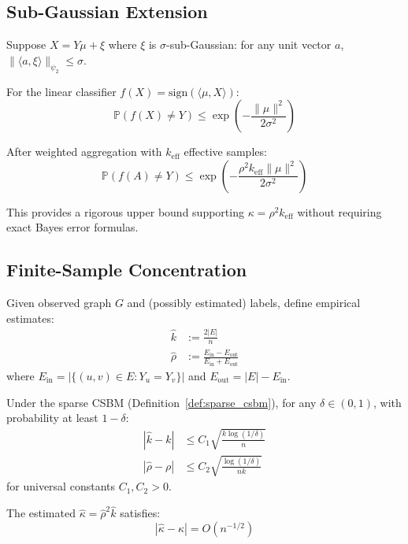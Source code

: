 \subsection{Sub-Gaussian Extension}
\label{subsec:subgaussian_rigorous}

\begin{theorem}
\label{thm:subgaussian_error}
Suppose $X = Y\mu + \xi$ where $\xi$ is $\sigma$-sub-Gaussian: for any unit vector $a$, $\|\langle a, \xi \rangle\|_{\psi_2} \leq \sigma$.

For the linear classifier $f(X) = \mathrm{sign}(\langle \mu, X \rangle)$:
\begin{equation}
    \mathbb{P}(f(X) \neq Y) \leq \exp\left(-\frac{\|\mu\|^2}{2\sigma^2}\right)
\end{equation}

After weighted aggregation with $k_{\mathrm{eff}}$ effective samples:
\begin{equation}
    \mathbb{P}(f(A) \neq Y) \leq \exp\left(-\frac{\rho^2 k_{\mathrm{eff}} \|\mu\|^2}{2\sigma^2}\right)
\end{equation}

This provides a rigorous upper bound supporting $\kappa = \rho^2 k_{\mathrm{eff}}$ without requiring exact Bayes error formulas.
\end{theorem}

\subsection{Finite-Sample Concentration}
\label{subsec:concentration_rigorous}

\begin{theorem}
\label{thm:kappa_estimation}
Given observed graph $G$ and (possibly estimated) labels, define empirical estimates:
\begin{align}
    \hat{k} &:= \frac{2|E|}{n} \\
    \hat{\rho} &:= \frac{E_{\mathrm{in}} - E_{\mathrm{out}}}{E_{\mathrm{in}} + E_{\mathrm{out}}}
\end{align}
where $E_{\mathrm{in}} = |\{(u,v) \in E : Y_u = Y_v\}|$ and $E_{\mathrm{out}} = |E| - E_{\mathrm{in}}$.

Under the sparse CSBM (Definition~\ref{def:sparse_csbm}), for any $\delta \in (0, 1)$, with probability at least $1 - \delta$:
\begin{align}
    |\hat{k} - k| &\leq C_1 \sqrt{\frac{k \log(1/\delta)}{n}} \\
    |\hat{\rho} - \rho| &\leq C_2 \sqrt{\frac{\log(1/\delta)}{nk}}
\end{align}
for universal constants $C_1, C_2 > 0$.

The estimated $\hat{\kappa} = \hat{\rho}^2 \hat{k}$ satisfies:
\begin{equation}
    |\hat{\kappa} - \kappa| = O\left(n^{-1/2}\right)
\end{equation}
\end{theorem}

